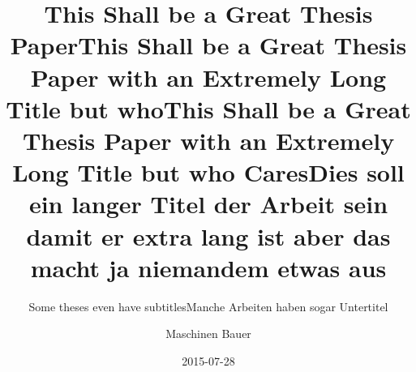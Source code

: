 \documentclass[online,a4paper,thesisdraft]{isw}
\title{This Shall be a Great Thesis Paper}
\title{This Shall be a Great Thesis Paper with an Extremely Long Title but who}
\title{This Shall be a Great Thesis Paper with an Extremely Long Title but who Cares}
\subtitle{Some theses even have subtitles}
\date{2015-07-28}
\author{Maschinen Bauer}
\begin{document}
    \frontmatter
    
    \maketitle
    
    \begin{otherlanguage}{ngerman}
        \title{Dies soll ein langer Titel der Arbeit sein damit er extra lang ist aber das macht ja niemandem etwas aus}
        \subtitle{Manche Arbeiten haben sogar Untertitel}
        \maketitle
    \end{otherlanguage}
    
    
    
    \begin{thesisabstract}
        \lipsum
    \end{thesisabstract}
    
    \begin{otherlanguage}{ngerman}
        \begin{thesisabstract}
            \lipsum
        \end{thesisabstract}
    \end{otherlanguage}
    
    \tableofcontents
    \listoffigures
    \listoftables
    
\end{document}
